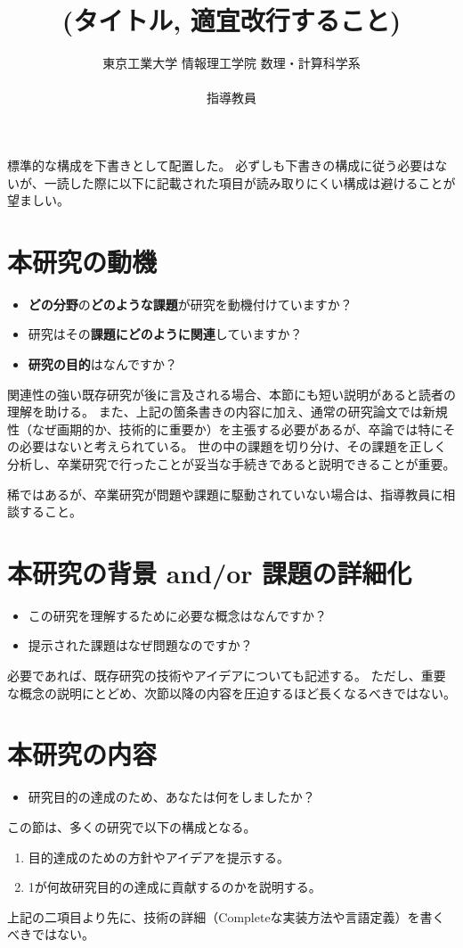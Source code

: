 \documentclass[11pt, a4paper, oneside, twocolumn]{jsarticle}
\title{%
(タイトル, 適宜改行すること)
}
\author{%
東京工業大学 情報理工学院 数理・計算科学系\\
\studentID \ 
\authorname \\
指導教員 \supervisor
}
\date{}
\begin{document}
\maketitle

標準的な構成を下書きとして配置した。
必ずしも下書きの構成に従う必要はないが、一読した際に以下に記載された項目が読み取りにくい構成は避けることが望ましい。

\section{本研究の動機}
\begin{itemize}
\item \textbf{どの分野}の\textbf{どのような課題}が研究を動機付けていますか？
\item 研究はその\textbf{課題にどのように関連}していますか？
\item \textbf{研究の目的}はなんですか？
\end{itemize}
関連性の強い既存研究が後に言及される場合、本節にも短い説明があると読者の理解を助ける。
また、上記の箇条書きの内容に加え、通常の研究論文では新規性（なぜ画期的か、技術的に重要か）を主張する必要があるが、卒論では特にその必要はないと考えられている。
世の中の課題を切り分け、その課題を正しく分析し、卒業研究で行ったことが妥当な手続きであると説明できることが重要。

稀ではあるが、卒業研究が問題や課題に駆動されていない場合は、指導教員に相談すること。

\section{本研究の背景 and/or 課題の詳細化}
\begin{itemize}
\item この研究を理解するために必要な概念はなんですか？
\item 提示された課題はなぜ問題なのですか？
\end{itemize}
必要であれば、既存研究の技術やアイデアについても記述する。
ただし、重要な概念の説明にとどめ、次節以降の内容を圧迫するほど長くなるべきではない。

\section{本研究の内容}
\begin{itemize}
\item 研究目的の達成のため、あなたは何をしましたか？
\end{itemize}
この節は、多くの研究で以下の構成となる。
\begin{enumerate}
\item 目的達成のための方針やアイデアを提示する。
\item 1が何故研究目的の達成に貢献するのかを説明する。
\end{enumerate}
上記の二項目より先に、技術の詳細（Completeな実装方法や言語定義）を書くべきではない。
\end{document}

